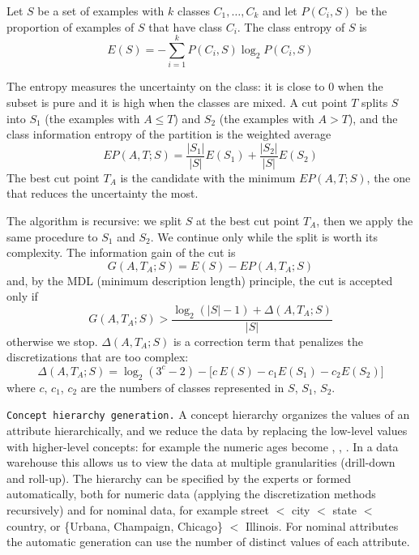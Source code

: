 \begin{definition}
Let $S$ be a set of examples with $k$ classes $C_1,\dots,C_k$ and let $P(C_i,S)$ be the proportion of examples of $S$ that have class $C_i$. The class entropy of $S$ is
\[
    E(S) = -\sum_{i=1}^{k} P(C_i,S)\log_2 P(C_i,S)
\]
\end{definition}

The entropy measures the uncertainty on the class: it is close to 0 when the subset is pure and it is high when the classes are mixed. A cut point $T$ splits $S$ into $S_1$ (the examples with $A\leq T$) and $S_2$ (the examples with $A>T$), and the class information entropy of the partition is the weighted average
\[
    EP(A,T;S) = \frac{|S_1|}{|S|}E(S_1)+\frac{|S_2|}{|S|}E(S_2)
\]
The best cut point $T_A$ is the candidate with the minimum $EP(A,T;S)$, the one that reduces the uncertainty the most.

The algorithm is recursive: we split $S$ at the best cut point $T_A$, then we apply the same procedure to $S_1$ and $S_2$. We continue only while the split is worth its complexity. The information gain of the cut is
\[
    G(A,T_A;S) = E(S) - EP(A,T_A;S)
\]
and, by the MDL (minimum description length) principle, the cut is accepted only if
\[
    G(A,T_A;S) > \frac{\log_2(|S|-1)+\Delta(A,T_A;S)}{|S|}
\]
otherwise we stop. $\Delta(A,T_A;S)$ is a correction term that penalizes the discretizations that are too complex:
\[
    \Delta(A,T_A;S) = \log_2(3^c-2) - \big[c\,E(S) - c_1E(S_1) - c_2E(S_2)\big]
\]
where $c$, $c_1$, $c_2$ are the numbers of classes represented in $S$, $S_1$, $S_2$.

\texttt{Concept hierarchy generation.} A concept hierarchy organizes the values of an attribute hierarchically, and we reduce the data by replacing the low-level values with higher-level concepts: for example the numeric ages become , , . In a data warehouse this allows us to view the data at multiple granularities (drill-down and roll-up). The hierarchy can be specified by the experts or formed automatically, both for numeric data (applying the discretization methods recursively) and for nominal data, for example street $<$ city $<$ state $<$ country, or \{Urbana, Champaign, Chicago\} $<$ Illinois. For nominal attributes the automatic generation can use the number of distinct values of each attribute.